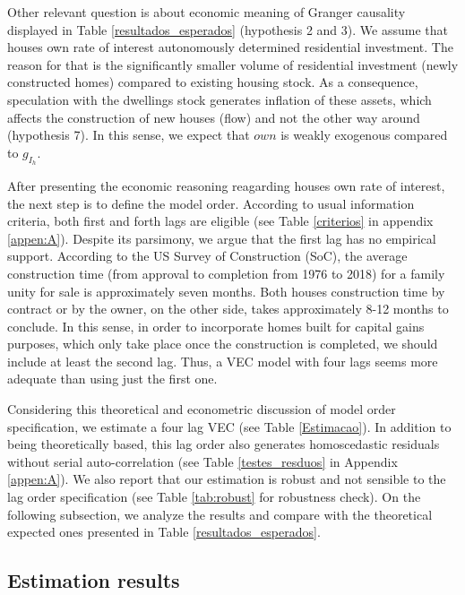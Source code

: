 \documentclass[12pt, a4paper]{article}
\begin{document}


Other relevant question is about economic meaning of Granger causality displayed in Table \ref{resultados_esperados} (hypothesis 2 and 3).
We assume that houses own rate of interest autonomously determined residential investment.
The reason for that is the significantly smaller volume of residential investment (newly constructed homes) compared to existing housing stock.
As a consequence, speculation with the dwellings stock generates inflation of these assets, which affects the construction of new houses (flow) and not the other way around (hypothesis 7).
In this sense, we expect that \(own\) is weakly exogenous compared to \(g_{I_{h}}\).

After presenting the economic reasoning reagarding houses own rate of interest,  the next step is to define the model order.
According to usual information criteria, both first and forth lags are eligible (see Table \ref{criterios} in appendix \ref{appen:A}).
Despite its parsimony, we argue that the first lag has no empirical support.
According to the US Survey of Construction (SoC), the average construction time (from approval to completion from 1976 to 2018) for a family unity for sale is approximately seven months.
Both houses construction time by contract or by the owner, on the other side, takes approximately 8-12 months to conclude.
In this sense, in order to incorporate homes built for capital gains purposes, which only take place once the construction is completed, we should include at least the second lag.
Thus, a VEC model with four lags seems more adequate than using just the first one.


Considering this theoretical and econometric discussion of model order specification, we estimate a four lag VEC  (see Table \ref{Estimacao}).
In addition to being theoretically based, this lag order also generates homoscedastic residuals without serial auto-correlation (see Table \ref{testes_resduos} in Appendix \ref{appen:A}).
We also report that our estimation is robust and not sensible to the lag order specification (see Table \ref{tab:robust} for robustness check).
On the following subsection, we analyze the results and compare with the theoretical expected ones presented in Table \ref{resultados_esperados}.


\subsection{Estimation results}
\label{sec:org1b645a8}
\label{sec:results}
\end{document}
